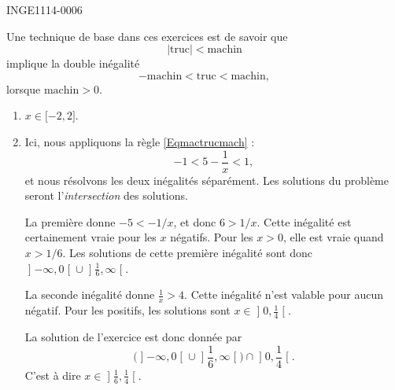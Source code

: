 

\begin{corrige}{INGE1114-0006}

	Une technique de base dans ces exercices est de savoir que
	\begin{equation}
		| \text{truc} |<\text{machin}
	\end{equation}
	implique la double inégalité
	\begin{equation}					\label{Eqmactrucmach}
		-\text{machin}<\text{truc}<\text{machin},
	\end{equation}
	lorsque $\text{machin}>0$.


	\begin{enumerate}

		\item
			$x\in\mathopen[ -2 , 2 \mathclose]$.
		\item
			Ici, nous appliquons la règle \eqref{Eqmactrucmach} :
			\begin{equation}
				-1<5-\frac{1}{ x }<1,
			\end{equation}
			et nous résolvons les deux inégalités séparément. Les solutions du problème seront l'\emph{intersection} des solutions. 

			La première donne $-5<-1/x$, et donc $6>1/x$. Cette inégalité est certainement vraie pour les $x$ négatifs. Pour les $x>0$, elle est vraie quand $x>1/6$. Les solutions de cette première inégalité sont donc $\mathopen] -\infty , 0 \mathclose[\cup\mathopen] \frac{1}{ 6 } , \infty \mathclose[$.

			La seconde inégalité donne $\frac{1}{ x }>4$. Cette inégalité n'est valable pour aucun négatif. Pour les positifs, les solutions sont $x\in\mathopen] 0 , \frac{1}{ 4 } \mathclose[$.

			La solution de l'exercice est donc donnée par
			\begin{equation}
				\Big(    \mathopen] -\infty , 0 \mathclose[\cup\mathopen] \frac{1}{ 6 } , \infty \mathclose[  \Big)\cap \mathopen] 0, \frac{1}{ 4 } \mathclose[.
			\end{equation}
			C'est à dire $x\in\mathopen] \frac{1}{ 6 } , \frac{1}{ 4 } \mathclose[$.



\end{enumerate}
\end{corrige}
